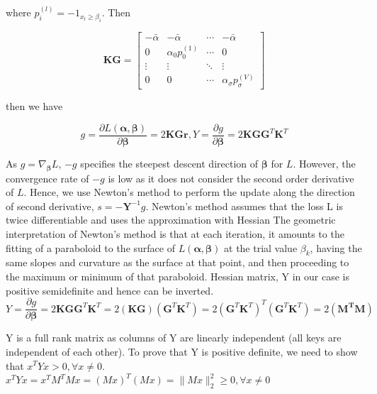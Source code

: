 where $p_i^{(l)}=-1_{x_l\geq \beta_i}$. Then

$$
\boldsymbol{KG}=\begin{bmatrix}
 -\bar{\alpha} & -\bar{\alpha} & \cdots & -\bar{\alpha} \\
 0 & \alpha_0p_0^{(1)} & \cdots  & 0 \\
 \vdots & \vdots & \ddots & \vdots \\
 0 & 0 & \cdots & \alpha_\sigma p_\sigma^{(V)}
\end{bmatrix}
$$

then we have 

\begin{equation}
	g=\frac{\partial L(\boldsymbol{\alpha},\boldsymbol{\beta})}{\partial \boldsymbol{\beta}}=2\boldsymbol{KGr},
	Y=\frac{\partial g}{\partial \boldsymbol{\beta}}=2\boldsymbol{KGG}^T \boldsymbol{K}^T
\end{equation}

As $g=\nabla_{\boldsymbol{\beta}} L$, $-g$ specifies the steepest descent direction of $\boldsymbol{\beta}$ for $L$. However, the convergence rate of $-g$ is low as it does not consider the second order derivative of $L$. Hence, we use Newton's method to perform the update along the direction of second derivative, $s=-\boldsymbol{Y}^{-1}g$. Newton's method assumes that the loss L is twice differentiable and uses the approximation with Hessian
The geometric interpretation of Newton's method is that at each iteration, it amounts to the fitting of a paraboloid to the surface of $L(\boldsymbol{\alpha},\boldsymbol{\beta})$  at the trial value $\beta_{k}$, having the same slopes and curvature as the surface at that point, and then proceeding to the maximum or minimum of that paraboloid. 
Hessian matrix, Y in our case is positive semidefinite and hence can be inverted. 
\begin{equation}
	Y=\frac{\partial g}{\partial \boldsymbol{\beta}}=2\boldsymbol{KGG}^T \boldsymbol{K}^T= 2 \boldsymbol{(KG)} (\boldsymbol{G}^T \boldsymbol{K}^T)=2 (\boldsymbol{G}^T \boldsymbol{K}^T)^T (\boldsymbol{G}^T \boldsymbol{K}^T)= 2\boldsymbol{({M}^TM)}
\end{equation}

Y is a full rank matrix as columns of Y are linearly independent (all keys are independent of each other). To prove that Y is positive definite, we need to show that ${x}^TYx > 0,  \forall x \neq 0$. \\ 
${x}^TYx = {x}^T{M}^TMx = {(Mx)}^T(Mx) = \| Mx\|_{2}^{2} \geq 0,\forall x \neq 0 $

